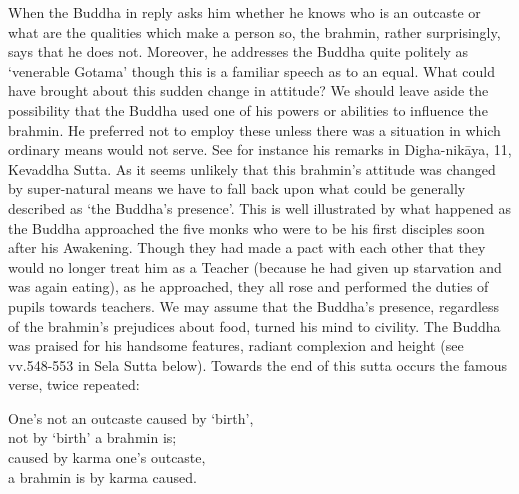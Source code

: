 When the Buddha in reply asks him whether he knows who is an outcaste or what are the qualities which make a person so, the brahmin, rather surprisingly, says that he does not. Moreover, he addresses the Buddha quite politely as `venerable Gotama' though this is a familiar speech as to an equal. What could have brought about this sudden change in attitude?
We should leave aside the possibility that the Buddha used one of his powers or abilities to influence the brahmin. He preferred not to employ these unless there was a situation in which ordinary means would not serve. See for instance his remarks in Digha-nik\=aya, 11, Kevaddha Sutta. As it seems unlikely that this brahmin's attitude was changed by super-natural means we have to fall back upon what could be generally described as `the Buddha's presence'. This is well illustrated by what happened as the Buddha approached the five monks who were to be his first disciples soon after his Awakening. Though they had made a pact with each other that they would no longer treat him as a Teacher (because he had given up starvation and was again eating), as he approached, they all rose and performed the duties of pupils towards teachers. We may assume that the Buddha's presence, regardless of the brahmin's prejudices about food, turned his mind to civility. The Buddha was praised for his handsome features, radiant complexion and height (see vv.548-553 in Sela Sutta below).
Towards the end of this sutta occurs the famous verse, twice repeated:

\begin{MyDescription}[]{}
One's not an outcaste caused by `birth',\\
not by `birth' a brahmin is;\\
caused by karma one's outcaste,\\
a brahmin is by karma caused.
\end{MyDescription}      


